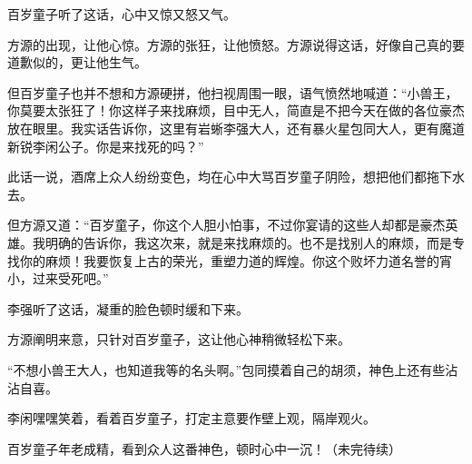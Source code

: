 \begin{this_body}
百岁童子听了这话，心中又惊又怒又气。

方源的出现，让他心惊。方源的张狂，让他愤怒。方源说得这话，好像自己真的要道歉似的，更让他生气。

但百岁童子也并不想和方源硬拼，他扫视周围一眼，语气愤然地喊道：“小兽王，你莫要太张狂了！你这样子来找麻烦，目中无人，简直是不把今天在做的各位豪杰放在眼里。我实话告诉你，这里有岩蜥李强大人，还有暴火星包同大人，更有魔道新锐李闲公子。你是来找死的吗？”

此话一说，酒席上众人纷纷变色，均在心中大骂百岁童子阴险，想把他们都拖下水去。

但方源又道：“百岁童子，你这个人胆小怕事，不过你宴请的这些人却都是豪杰英雄。我明确的告诉你，我这次来，就是来找麻烦的。也不是找别人的麻烦，而是专找你的麻烦！我要恢复上古的荣光，重塑力道的辉煌。你这个败坏力道名誉的宵小，过来受死吧。”

李强听了这话，凝重的脸色顿时缓和下来。

方源阐明来意，只针对百岁童子，这让他心神稍微轻松下来。

“不想小兽王大人，也知道我等的名头啊。”包同摸着自己的胡须，神色上还有些沾沾自喜。

李闲嘿嘿笑着，看着百岁童子，打定主意要作壁上观，隔岸观火。

百岁童子年老成精，看到众人这番神色，顿时心中一沉！（未完待续）

\end{this_body}

